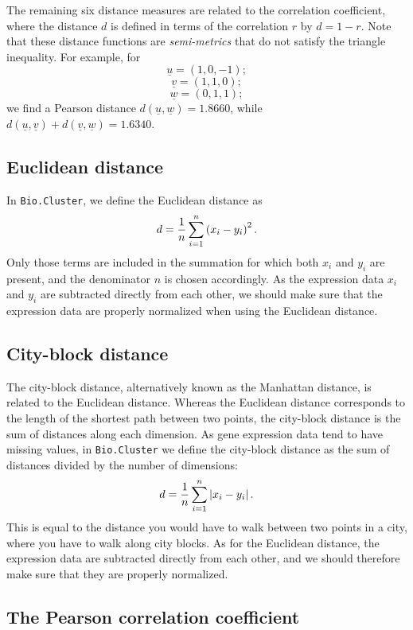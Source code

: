 \documentclass{report}
\begin{document}
The remaining six distance measures are related to the correlation coefficient, where the distance $d$ is defined in terms of the correlation $r$ by $d=1-r$.  Note that these distance functions are \emph{semi-metrics} that do not satisfy the triangle inequality. For example, for
$$\underline{u}=\left(1,0,-1\right);$$
$$\underline{v}=\left(1,1,0\right);$$
$$\underline{w}=\left(0,1,1\right);$$
we find a Pearson distance
$d\left(\underline{u},\underline{w}\right) = 1.8660$, while
$d\left(\underline{u},\underline{v}\right)+d\left(\underline{v},\underline{w}\right) = 1.6340$.

\subsection*{Euclidean distance}

In \verb|Bio.Cluster|, we define the Euclidean distance as
$$d = {1 \over n} \sum_{i=1}^{n} \left(x_i-y_i\right)^{2}.$$
Only those terms are included in the summation for which both
$x_i$ and $y_i$ are present, and the denominator $n$ is chosen accordingly.
As the expression data $x_i$ and $y_i$ are subtracted directly from each other, we should make sure that the expression data are properly normalized when using the Euclidean distance.

\subsection*{City-block distance}

The city-block distance, alternatively known as the Manhattan distance, is related to the Euclidean distance. Whereas the Euclidean distance corresponds to the length of the shortest path between two points, the city-block distance is the sum of distances along each dimension. As gene expression data tend to have missing values, in \verb|Bio.Cluster| we define the city-block distance as the sum of distances divided by the number of dimensions:
$$d = {1 \over n} \sum_{i=1}^n \left|x_i-y_i\right|.$$
This is equal to the distance you would have to walk between two points in a city, where you have to walk along city blocks. As for the Euclidean distance,
the expression data are subtracted directly from each other, and we should therefore make sure that they are properly normalized.

\subsection*{The Pearson correlation coefficient}
\end{document}
